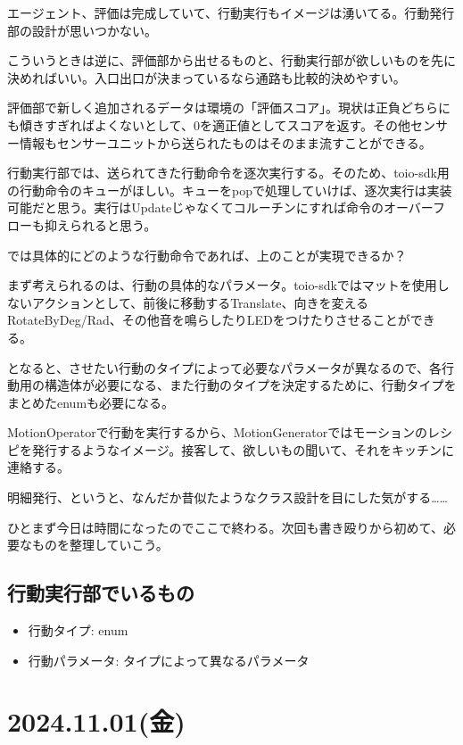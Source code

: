 \documentclass[fleqn,twocolumn]{mynote}
\begin{document}
  エージェント、評価は完成していて、行動実行もイメージは湧いてる。行動発行部の設計が思いつかない。

  こういうときは逆に、評価部から出せるものと、行動実行部が欲しいものを先に決めればいい。入口出口が決まっているなら通路も比較的決めやすい。

  評価部で新しく追加されるデータは環境の「評価スコア」。現状は正負どちらにも傾きすぎればよくないとして、0を適正値としてスコアを返す。その他センサー情報もセンサーユニットから送られたものはそのまま流すことができる。

  行動実行部では、送られてきた行動命令を逐次実行する。そのため、toio-sdk用の行動命令のキューがほしい。キューをpopで処理していけば、逐次実行は実装可能だと思う。実行はUpdateじゃなくてコルーチンにすれば命令のオーバーフローも抑えられると思う。

  では具体的にどのような行動命令であれば、上のことが実現できるか？

  まず考えられるのは、行動の具体的なパラメータ。toio-sdkではマットを使用しないアクションとして、前後に移動するTranslate、向きを変えるRotateByDeg/Rad、その他音を鳴らしたりLEDをつけたりさせることができる。

  となると、させたい行動のタイプによって必要なパラメータが異なるので、各行動用の構造体が必要になる、また行動のタイプを決定するために、行動タイプをまとめたenumも必要になる。

  MotionOperatorで行動を実行するから、MotionGeneratorではモーションのレシピを発行するようなイメージ。接客して、欲しいもの聞いて、それをキッチンに連絡する。

  明細発行、というと、なんだか昔似たようなクラス設計を目にした気がする……

  ひとまず今日は時間になったのでここで終わる。次回も書き殴りから初めて、必要なものを整理していこう。

  \subsection*{行動実行部でいるもの}
  \begin{itemize}
    \item 行動タイプ: enum
    \item 行動パラメータ: タイプによって異なるパラメータ
  \end{itemize}

  \section*{2024.11.01(金)}
\end{document}
